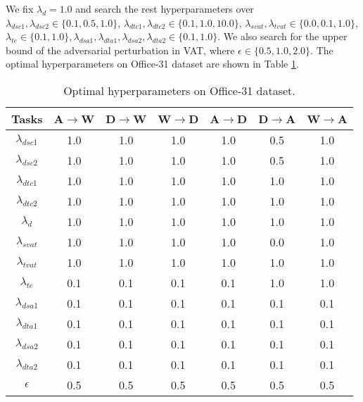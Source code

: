 \documentclass{ecai}
\begin{document}
We fix $\lambda_{d} = 1.0$ and search the rest hyperparameters over $\lambda_{dsc1},\lambda_{dsc2} \in \{0.1,0.5,1.0\}$, $\lambda_{dtc1},\lambda_{dtc2} \in \{0.1,1.0,10.0\}$, $\lambda_{svat},\lambda_{tvat} \in \{0.0,0.1,1.0\}$, $\lambda_{te} \in \{0.1,1.0\}, \lambda_{dsa1},\lambda_{dta1},\lambda_{dsa2},\lambda_{dta2} \in \{0.1,1.0\}$. We also search for the upper bound of the adversarial perturbation in VAT, where $\epsilon \in \{0.5,1.0,2.0\}$. The optimal hyperparameters on Office-31 dataset are shown in Table \ref{param}.


\begin{table}
\centering
\caption{Optimal hyperparameters on Office-31 dataset.}
\begin{tabular}{ccccccc}
\toprule
Tasks&   A$\rightarrow$W&   D$\rightarrow$W&   W$\rightarrow$D&   A$\rightarrow$D&   D$\rightarrow$A&   W$\rightarrow$A \\
\midrule
$\lambda_{dsc1}$&   1.0& 1.0& 1.0& 1.0& 0.5& 1.0\\
$\lambda_{dsc2}$&   1.0& 1.0& 1.0& 1.0& 0.5& 1.0\\
$\lambda_{dtc1}$&   1.0& 1.0& 1.0& 1.0& 1.0& 1.0\\
$\lambda_{dtc2}$&   1.0& 1.0& 1.0& 1.0& 1.0& 1.0\\
$\lambda_{d}$&      1.0& 1.0& 1.0& 1.0& 1.0& 1.0\\
$\lambda_{svat}$&   1.0& 1.0& 1.0& 1.0& 0.0& 1.0\\
$\lambda_{tvat}$&   1.0& 1.0& 1.0& 1.0& 1.0& 1.0\\
$\lambda_{te}$&     0.1& 0.1& 0.1& 0.1& 1.0& 1.0\\
$\lambda_{dsa1}$&   0.1& 0.1& 0.1& 0.1& 0.1& 0.1\\
$\lambda_{dta1}$&   0.1& 0.1& 0.1& 0.1& 0.1& 0.1\\
$\lambda_{dsa2}$&   0.1& 0.1& 0.1& 0.1& 0.1& 0.1\\
$\lambda_{dta2}$&   0.1& 0.1& 0.1& 0.1& 0.1& 0.1\\
$\epsilon$&         0.5& 0.5& 0.5& 0.5& 0.5& 0.5\\
\bottomrule
\end{tabular}
\label{param}
\end{table}
\end{document}
